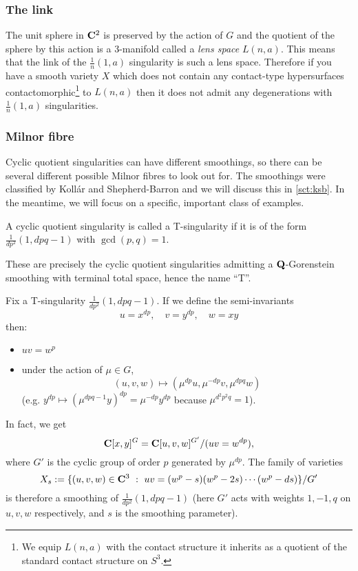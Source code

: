 \documentclass{article}
\begin{document}
\subsubsection{The link}


The unit sphere in \(\mathbf{C}^2\) is preserved by the action of \(G\) and
the quotient of the sphere by this action is a 3-manifold called a
{\em lens space} \(L(n,a)\). This means that the link of the
\(\frac{1}{n}(1,a)\) singularity is such a lens space. Therefore if
you have a smooth variety \(X\) which does not contain any
contact-type hypersurfaces contactomorphic\footnote{We equip
\(L(n,a)\) with the contact structure it inherits as a quotient of the
standard contact structure on \(S^3\).} to \(L(n,a)\) then it does not
admit any degenerations with \(\frac{1}{n}(1,a)\) singularities.


\subsubsection{Milnor fibre}


Cyclic quotient singularities can have different smoothings, so there
can be several different possible Milnor fibres to look out for. The
smoothings were classified by Koll\'{a}r and Shepherd-Barron
\cite{KSB} and we will discuss this in \cref{sct:ksb}. In the
meantime, we will focus on a specific, important class of examples.


\begin{Definition}[T-singularities]\label{dfn:tsing}
A cyclic quotient singularity is called a T-singularity if it is of
the form \(\frac{1}{dp^2}(1,dpq-1)\) with \(\gcd(p,q)=1\).


\end{Definition}
\begin{Remark}\label{rmk:tsing}
These are precisely the cyclic quotient singularities admitting a
\(\mathbf{Q}\)-Gorenstein smoothing with terminal total space, hence the
name ``T''.


\end{Remark}
Fix a T-singularity \(\frac{1}{dp^2}(1,dpq-1)\). If we define the
semi-invariants \[u=x^{dp},\quad v=y^{dp},\quad w=xy\] then:
\begin{itemize}
\item \(uv=w^p\)
\item under the action of \(\mu\in G\),
\[(u,v,w)\mapsto(\mu^{dp}u,\mu^{-dp}v,\mu^{dpq}w)\]
(e.g. \(y^{dp}\mapsto(\mu^{dpq-1}y)^{dp}=\mu^{-dp}y^{dp}\) because
\(\mu^{d^2p^2q}=1\)).
\end{itemize}
In fact, we get \[\mathbf{C}[x,y]^G=\mathbf{C}[u,v,w]^{G'}/(uv=w^{dp}),\] where
\(G'\) is the cyclic group of order \(p\) generated by
\(\mu^{dp}\). The family of varieties \[X_s:=\{(u,v,w)\in\mathbf{C}^3\ :\
uv=(w^p-s)(w^p-2s)\cdots(w^p-ds)\}/G'\] is therefore a smoothing of
\(\frac{1}{dp^2}(1,dpq-1)\) (here \(G'\) acts with weights \(1,-1,q\)
on \(u,v,w\) respectively, and \(s\) is the smoothing parameter).
\end{document}
